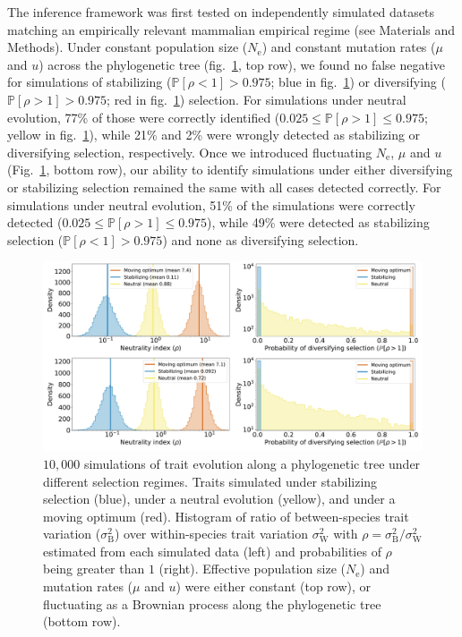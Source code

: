 \documentclass{article}
\newcommand{\Ne}{N_{\text{e}}}
\newcommand{\proba}{\mathbb{P}}
\newcommand{\MutationRatePheno}{\mu}
\newcommand{\MutationRateNuc}{u}
\newcommand{\RateBetween}{\sigma^2_{\mathrm{B}}}
\newcommand{\RateWhithin}{\sigma^2_{\mathrm{W}}}
\newcommand{\NI}{\rho}
\begin{document}
The inference framework was first tested on independently simulated datasets matching an empirically relevant mammalian empirical regime (see Materials and Methods).
Under constant population size ($\Ne$) and constant mutation rates ($\MutationRatePheno$ and $\MutationRateNuc$) across the phylogenetic tree (fig.~\ref{fig:results-simulations}, top row), we found no false negative for simulations of stabilizing ($\proba [\NI < 1] > 0.975$; blue in fig.~\ref{fig:results-simulations}) or diversifying ($\proba [\NI > 1] > 0.975$; red in fig.~\ref{fig:results-simulations}) selection.
For simulations under neutral evolution, 77\% of those were correctly identified ($0.025 \leq \proba [\NI > 1] \leq 0.975$; yellow in fig.~\ref{fig:results-simulations}), while 21\% and 2\% were wrongly detected as stabilizing or diversifying selection, respectively.
Once we introduced fluctuating $\Ne$, $\MutationRatePheno$ and $\MutationRateNuc$(Fig.~\ref{fig:results-simulations}, bottom row), our ability to identify simulations under either diversifying or stabilizing selection remained the same with all cases detected correctly.
For simulations under neutral evolution, 51\% of the simulations were correctly detected ($0.025 \leq \proba [\NI > 1] \leq 0.975$), while 49\% were detected as stabilizing selection ($\proba [\NI < 1] > 0.975$) and none as diversifying selection.

\begin{figure}[!ht]
    \centering
    \includegraphics[width=\textwidth, page=1] {figure3}
    \caption{
        $10,000$ simulations of trait evolution along a phylogenetic tree under different selection regimes.
        Traits simulated under stabilizing selection (blue), under a neutral evolution (yellow), and under a moving optimum (red).
        Histogram of ratio of between-species trait variation ($\RateBetween$) over within-species trait variation $\RateWhithin$ with $\NI = \RateBetween / \RateWhithin$ estimated from each simulated data (left) and probabilities of $\NI$ being greater than $1$ (right).
        Effective population size ($\Ne$) and mutation rates ($\MutationRatePheno$ and $\MutationRateNuc$) were either constant (top row), or fluctuating as a Brownian process along the phylogenetic tree (bottom row).
    }
    \label{fig:results-simulations}
\end{figure}
\end{document}
